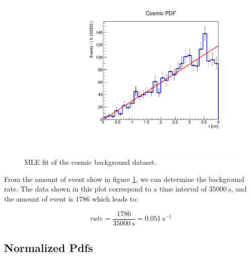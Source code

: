\documentclass[11pt,a4paper,oneside]{article}
\begin{document}
\begin{figure}[hbtp]

\centering
\includegraphics[width = 1\textwidth]{../ALPHA-2/PlotMLEfit/SingleModel/Cosmici_fit.pdf}
\caption{ MLE fit of the cosmic background dataset.}
\label{fig:CosmicBackground}
\end{figure}

From the amount of event show in figure \ref{fig:CosmicBackground}, we can determine the background rate. The data shown in this plot correspond to a time interval of $\SI{35000}{\second}$, and the amount of event is $1786$ which leads to:

\begin{equation} \label{eq:Rate}
rate = \frac{1786}{\SI{35000}{\second}} = \SI{0.051}{\second \tothe{-1}}
\end{equation}

\subsection{Normalized Pdfs}
\end{document}
